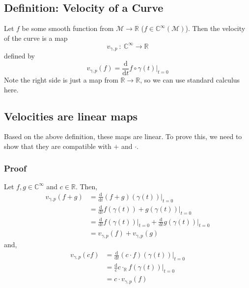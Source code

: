 \documentclass[10pt]{article}
\newcommand{\R}{\mathbb{R}}
\begin{document}
\subsection*{Definition: Velocity of a Curve}
Let $f$ be some smooth function from $\mathcal{M} \rightarrow \mathbb{R}$ ($f \in \mathbb{C}^\infty (\mathcal{M})$).  Then the velocity of the curve is a map
\[v_{\gamma, p} \::\: \mathbb{C}^\infty \rightarrow \mathbb{R}\]
defined by
\[v_{\gamma, p} (f) = \frac{\text{d}}{\text{d}t} f \circ \gamma(t) \bigg|_{t = 0}\]
Note the right side is just a map from $\R \rightarrow \R$, so we can use standard calculus here.

\subsection*{Velocities are linear maps}
Based on the above definition, these maps are linear.  To prove this, we need to show that they are compatible with $+$ and $\cdot$.
\subsubsection*{Proof}
Let $f, g \in \mathbb{C}^\infty$ and $c \in \R$.  Then,
\begin{align*}
    v_{\gamma, p}(f + g) &= \frac{\text{d}}{\text{d}t} (f + g)(\gamma(t)) \bigg|_{t = 0}\\
    &= \frac{\text{d}}{\text{d}t} f(\gamma(t)) + g(\gamma(t)) \bigg|_{t = 0}\\
    &= \frac{\text{d}}{\text{d}t} f(\gamma(t)) \bigg|_{t = 0} + \frac{\text{d}}{\text{d}t}  g(\gamma(t)) \bigg|_{t = 0}\\
    &= v_{\gamma, p}(f) + v_{\gamma, p}(g)
\end{align*}
and,
\begin{align*}
    v_{\gamma, p}(cf) &= \frac{\text{d}}{\text{d}t} (c \cdot f)(\gamma(t)) \bigg|_{t = 0}\\
    &= \frac{\text{d}}{\text{c}} c \cdot_{\R} f(\gamma(t)) \bigg|_{t = 0}\\
    &= c \cdot v_{\gamma, p}(f)
\end{align*}
\end{document}
